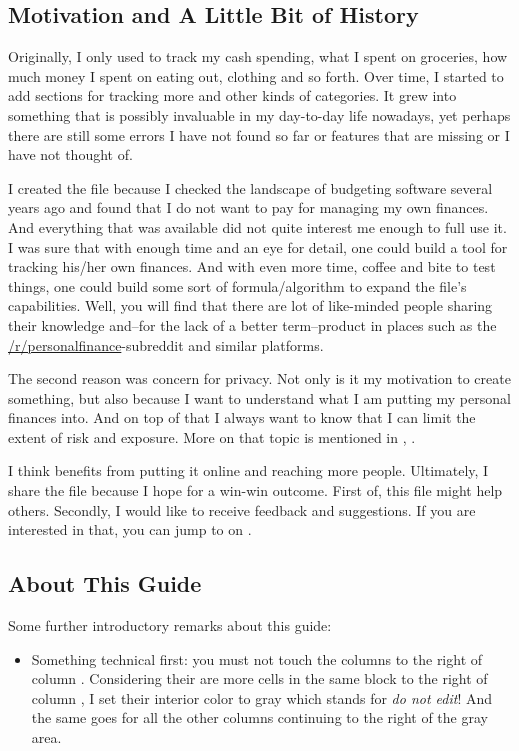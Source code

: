 \subsection{Motivation and A Little Bit of History}
\label{subsec:motivation-history}

Originally, I only used \tfn to track my cash spending, \ie what I spent on groceries, how much money I spent on eating out, clothing and so forth.
Over time, I started to add sections for tracking more and other kinds of categories.
It grew into something that is possibly invaluable in my day-to-day life nowadays, yet perhaps there are still some errors I have not found so far or features that are missing or I have not thought of.

I created the file because I checked the landscape of budgeting software several years ago and found that I do not want to pay for managing my own finances.
And everything that was available did not quite interest me enough to full use it.
I was sure that with enough time and an eye for detail, one could build a tool for tracking his/her own finances.
And with even more time, coffee and bite to test things, one could build some sort of formula/algorithm to expand the file's capabilities.
Well, you will find that there are lot of like-minded people sharing their knowledge and--for the lack of a better term--product in places such as the \href{https://reddit.com/r/personalfinance}{/r/personalfinance}-subreddit and similar platforms.

The second reason was concern for privacy.
Not only is it my motivation to create something, but also because I want to understand what I am putting my personal finances into.
And on top of that I always want to know that I can limit the extent of risk and exposure.
More on that topic is mentioned in , .

I think \tfn benefits from putting it online and reaching more people.
Ultimately, I share the file because I hope for a win-win outcome.
First of, this file might help others.
Secondly, I would like to receive feedback and suggestions.
If you are interested in that, you can jump to  on .

\subsection{About This Guide}
\label{subsec:about-this-guide}

Some further introductory remarks about this guide:
\begin{itemize}
	\item Something technical first:
	you must not touch the columns to the right of column .
	Considering their are more cells in the same block to the right of column , I set their interior color to gray which stands for \emph{do not edit}!
	And the same goes for all the other columns continuing to the right of the gray area.
\end{itemize}